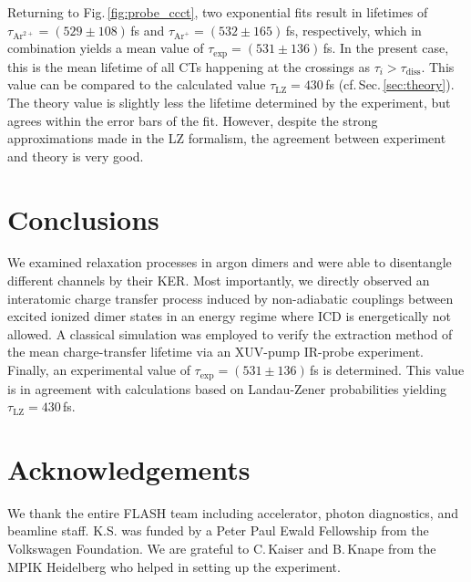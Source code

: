 \documentclass[%
 aip,
rsi,%
 amsmath,amssymb,
preprint,%
]{revtex4-1}
\begin{document}
Returning to Fig.\,\ref{fig:probe_ccct}, two exponential fits result in lifetimes of $\tau_{\mathrm{Ar}^{2+}} = (529 \pm 108)$\,fs and $\tau_{\mathrm{Ar}^{+}} = (532 \pm 165)$\,fs, respectively, which in combination yields a mean value of $\tau_{\mathrm{exp}} = (531 \pm 136)$\,fs. In the present case, this is the mean lifetime of all CTs happening at the crossings as $\tau_{i} > \tau_{\mathrm{diss}}$. This value can be compared to the calculated value $\tau_{\mathrm{LZ}} = 430$\,fs (cf.\,Sec.\,\ref{sec:theory}). The theory value is slightly less the lifetime determined by the experiment, but agrees within the error bars of the fit. 
However, despite the strong approximations made in the LZ formalism, the agreement between experiment and theory is very good.   


\section{Conclusions}
 \label{sec:conclusions}
 
We examined relaxation processes in argon dimers and were able to disentangle different channels by their KER. Most importantly, we directly observed an interatomic charge transfer process induced by non-adiabatic couplings between excited ionized dimer states in an energy regime where ICD is energetically not allowed. A classical simulation was employed to verify the extraction method of the mean charge-transfer lifetime via an XUV-pump IR-probe experiment. Finally, an experimental value of \mbox{$\tau_{\mathrm{exp}} = (531 \pm 136)$\,fs} is determined. This value is in agreement with calculations based on Landau-Zener probabilities yielding $\tau_{\mathrm{LZ}} = 430$\,fs. 
   

\section*{Acknowledgements}

We thank the entire FLASH team including accelerator, photon diagnostics, and beamline staff. K.S. was funded by a Peter Paul Ewald Fellowship from the Volkswagen Foundation. We are grateful to C.\,Kaiser and B.\,Knape from the MPIK Heidelberg who helped in setting up the experiment.

\nocite{*}
\end{document}
